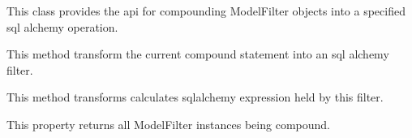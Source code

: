 \documentclass[letterpaper,10pt,english]{sphinxmanual}
\begin{document}
\begin{fulllineitems}
\label{features/mvc:fantastico.mvc.models.model_filter_compound.ModelFilterCompound}
This class provides the api for compounding ModelFilter objects into a specified sql alchemy operation.

\begin{fulllineitems}
\label{features/mvc:fantastico.mvc.models.model_filter_compound.ModelFilterCompound.build}
This method transform the current compound statement into an sql alchemy filter.

\end{fulllineitems}


\begin{fulllineitems}
\label{features/mvc:fantastico.mvc.models.model_filter_compound.ModelFilterCompound.get_expression}
This method transforms calculates sqlalchemy expression held by this filter.

\end{fulllineitems}


\begin{fulllineitems}
\label{features/mvc:fantastico.mvc.models.model_filter_compound.ModelFilterCompound.model_filters}
This property returns all ModelFilter instances being compound.

\end{fulllineitems}


\end{fulllineitems}

\end{document}
